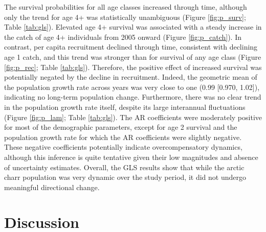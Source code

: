 \documentclass[11pt]{article}
\begin{document}
The survival probabilities for all age classes increased through time,
although only the trend for age 4+ was statistically unambiguous 
(Figure \ref{fig:p_surv}; Table \ref{tab:gls}).
Elevated age 4+ survival was associated with a steady increase in the catch of
age 4+ individuals from 2005 onward (Figure \ref{fig:p_catch}). 
In contrast, per capita recruitment declined through time, 
consistent with declining age 1 catch,
and this trend was stronger than for survival of any age class
(Figure \ref{fig:p_rec}; Table \ref{tab:gls}).
Therefore, the positive effect of increased survival 
was potentially negated by the decline in recruitment.
Indeed, the geometric mean of the population growth rate across years was very close to one
(0.99 [0.970, 1.02]), indicating no long-term population change.
Furthermore, there was no clear trend in the population growth rate itself,
despite its large interannual fluctuations
(Figure \ref{fig:p_lam}; Table \ref{tab:gls}).
The AR coefficients were moderately positive for most of the demographic parameters,
except for age 2 survival and the population growth rate 
for which the AR coefficients were slightly negative.
These negative coefficients potentially indicate overcompensatory dynamics,
although this inference is quite tentative given their low magnitudes 
and absence of uncertainty estimates.
Overall, the GLS results show that while the arctic charr population was very dynamic
over the study period, it did not undergo meaningful directional change.







\section*{Discussion}
\end{document}

